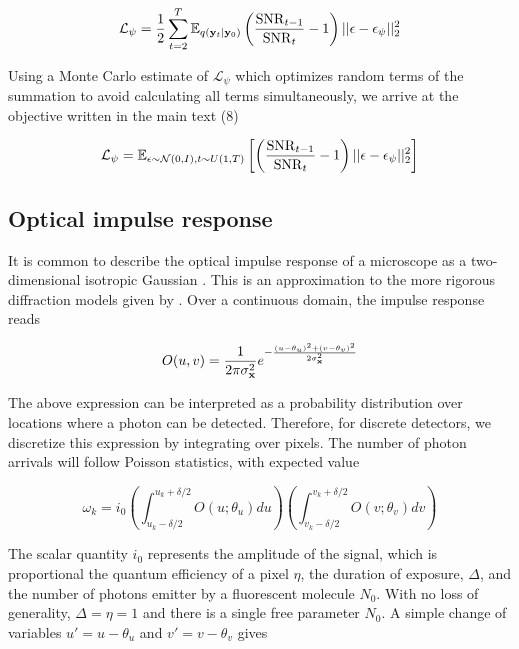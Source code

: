 \documentclass{article}
\begin{document}
\begin{equation*}
\mathcal{L}_{\psi} = \frac{1}{2}\sum_{t=2}^{T} \mathbb{E}_{q(\bold{y}_{t}|\bold{y}_{0})}\left(\frac{\mathrm{SNR}_{t-1}}{{\mathrm{SNR}_{t}}}-1\right)\lvert\lvert \bold{\epsilon}-\bold{\epsilon}_{\psi}\lvert\lvert_{2}^{2}
\end{equation*}

Using a Monte Carlo estimate of $\mathcal{L}_{\psi}$ \citep{Kingma2023} which optimizes random terms of the summation to avoid calculating all terms simultaneously, we arrive at the objective written in the main text (8)

\begin{equation*}
\mathcal{L}_{\psi} = \mathbb{E}_{\epsilon\sim \mathcal{N}(0,I),t\sim U(1,T)}\left[\left(\frac{\mathrm{SNR}_{t-1}}{{\mathrm{SNR}_{t}}}-1\right)\lvert\lvert \bold{\epsilon}-\bold{\epsilon}_{\psi}\lvert\lvert_{2}^{2}\right]
\end{equation*}


\subsection{Optical impulse response}

It is common to describe the optical impulse response of a microscope as a two-dimensional isotropic Gaussian \citep{Zhang2007}. This is an approximation to the more rigorous diffraction models given by \citep{Richards1959,Gibson1989}. Over a continuous domain, the impulse response reads

\begin{equation*}
O(u,v) = \frac{1}{2\pi\sigma_{\bold{x}}^{2}}e^{-\frac{(u-\theta_{u})^{2}+(v-\theta_{v})^{2}}{2\sigma_{\bold{x}}^{2}}}
\end{equation*}

The above expression can be interpreted as a probability distribution over locations where a photon can be detected. Therefore, for discrete detectors, we discretize this expression by integrating over pixels. The number of photon arrivals will follow Poisson statistics, with expected value

\begin{equation*}
\omega_{k} = i_{0}\left(\int_{u_{k}-\delta /2}^{u_{k}+\delta /2} O(u; \theta_{u})du \right)\left(\int_{v_{k}-\delta /2}^{v_{k}+\delta /2} O(v;\theta_{v})dv \right)
\end{equation*}

The scalar quantity $i_{0}$ represents the amplitude of the signal, which is proportional the quantum efficiency of a pixel $\eta$, the duration of exposure, $\Delta$, and the number of photons emitter by a fluorescent molecule $N_{0}$. With no loss of generality, $\Delta = \eta = 1$ and there is a single free parameter $N_{0}$. A simple change of variables $u' = u - \theta_{u}$ and $v' = v-\theta_{v}$ gives
\end{document}
